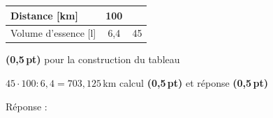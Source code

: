 \begin{parts}
\begin{solutionorgrid}[180pt]
\vspace{5pt}
\def\arraystretch{1.5}
\begin{tabularx}{0.5\textwidth}{l|C|C|}
Distance [km]&100&\\
\hline
Volume d'essence [l]&6,4&45\\
\end{tabularx}
\def\arraystretch{1}
 
\hfill\textbf{(0,5\,pt)} pour la construction du tableau
 
\vspace{15pt}$45 \cdot 100 : 6,4 = 703,125$\,km  \hfill calcul \textbf{(0,5\,pt)} et réponse \textbf{(0,5\,pt)}
\end{solutionorgrid}
 
\begin{tcolorbox}[enhanced jigsaw, interior hidden, colframe=box, parbox=false]%
Réponse : 
\end{tcolorbox}
\end{parts}